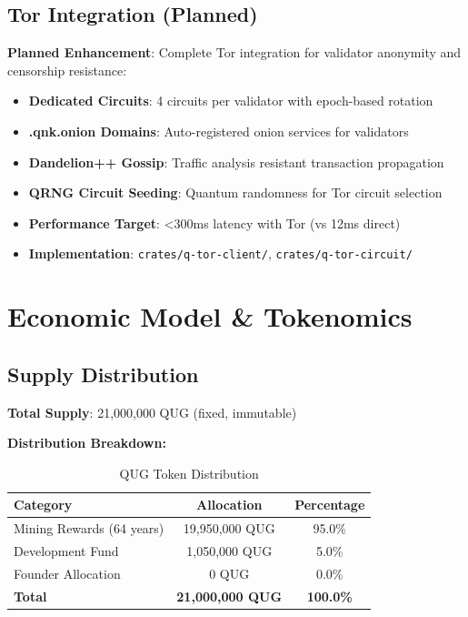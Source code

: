 \documentclass[11pt,a4paper]{scrartcl}
\begin{document}
\subsection{Tor Integration (Planned)}

\textbf{Planned Enhancement}: Complete Tor integration for validator anonymity and censorship resistance:

\begin{itemize}
\item \textbf{Dedicated Circuits}: 4 circuits per validator with epoch-based rotation
\item \textbf{.qnk.onion Domains}: Auto-registered onion services for validators
\item \textbf{Dandelion++ Gossip}: Traffic analysis resistant transaction propagation
\item \textbf{QRNG Circuit Seeding}: Quantum randomness for Tor circuit selection
\item \textbf{Performance Target}: <300ms latency with Tor (vs 12ms direct)
\item \textbf{Implementation}: \texttt{crates/q-tor-client/}, \texttt{crates/q-tor-circuit/}
\end{itemize}

\newpage

\section{Economic Model \& Tokenomics}

\subsection{Supply Distribution}

\textbf{Total Supply}: 21,000,000 QUG (fixed, immutable)

\textbf{Distribution Breakdown:}

\begin{table}[h]
\centering
\begin{tabular}{lcc}
\toprule
\textbf{Category} & \textbf{Allocation} & \textbf{Percentage} \\
\midrule
Mining Rewards (64 years) & 19,950,000 QUG & 95.0\% \\
Development Fund & 1,050,000 QUG & 5.0\% \\
Founder Allocation & 0 QUG & 0.0\% \\
\midrule
\textbf{Total} & \textbf{21,000,000 QUG} & \textbf{100.0\%} \\
\bottomrule
\end{tabular}
\caption{QUG Token Distribution}
\end{table}
\end{document}

